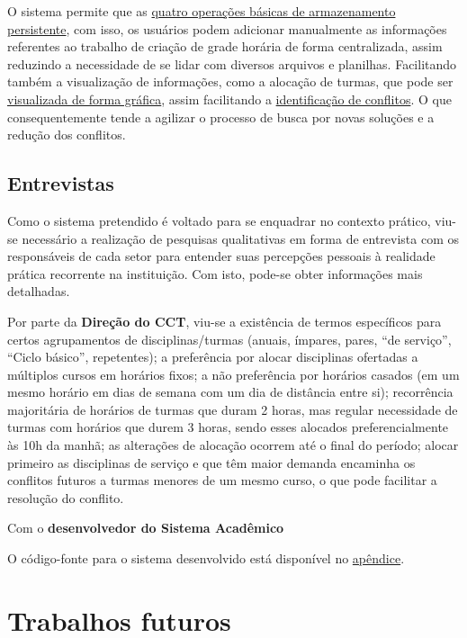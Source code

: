 O sistema permite que as \hyperref[sssec:Funcionalidades Iniciais]{quatro operações básicas de armazenamento persistente}, com isso, os usuários podem adicionar manualmente as informações referentes ao trabalho de criação de grade horária de forma centralizada, assim reduzindo a necessidade de se lidar com diversos arquivos e planilhas. Facilitando também a visualização de informações, como a alocação de turmas, que pode ser \hyperref[fig:multiFiltros]{visualizada de forma gráfica}, assim facilitando a \hyperref[sec:conflitos]{identificação de conflitos}. O que consequentemente tende a agilizar o processo de busca por novas soluções e a redução dos conflitos.

\subsection{Entrevistas}

Como o sistema pretendido é voltado para se enquadrar no contexto prático, viu-se necessário a realização de pesquisas qualitativas em forma de entrevista com os responsáveis de cada setor para entender suas percepções pessoais à realidade prática recorrente na instituição. Com isto, pode-se obter informações mais detalhadas.

Por parte da \textbf{Direção do CCT}, viu-se a existência de termos específicos para certos agrupamentos de disciplinas/turmas (anuais, ímpares, pares, ``de serviço'', ``Ciclo básico'', repetentes); a preferência por alocar disciplinas ofertadas a múltiplos cursos em horários fixos; a não preferência por horários casados (em um mesmo horário em dias de semana com um dia de distância entre si); recorrência majoritária de horários de turmas que duram 2 horas, mas regular necessidade de turmas com horários que durem 3 horas, sendo esses alocados preferencialmente às 10h da manhã; as alterações de alocação ocorrem até o final do período; alocar primeiro as disciplinas de serviço e que têm maior demanda encaminha os conflitos futuros a turmas menores de um mesmo curso, o que pode facilitar a resolução do conflito.

Com o \textbf{desenvolvedor do Sistema Acadêmico}

O código-fonte para o sistema desenvolvido está disponível no \hyperref[apendice:CodigoFonte]{apêndice}.

\section{Trabalhos futuros} %

